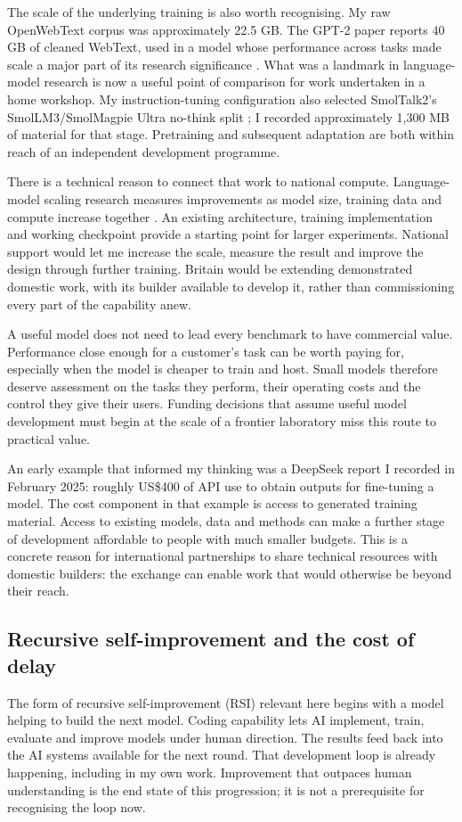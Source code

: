 The scale of the underlying training is also worth recognising. My raw
OpenWebText corpus was approximately 22.5 GB. The GPT-2 paper reports
40 GB of cleaned WebText, used in a model whose performance across tasks
made scale a major part of its research significance \cite{radford2019}.
What was a landmark in language-model research is now a useful point of
comparison for work undertaken in a home workshop. My instruction-tuning
configuration also selected SmolTalk2's SmolLM3/SmolMagpie Ultra no-think
split \cite{smoltalk2}; I recorded approximately 1,300 MB of material for
that stage. Pretraining and subsequent adaptation are both within reach
of an independent development programme.

There is a technical reason to connect that work to national compute.
Language-model scaling research measures improvements as model size,
training data and compute increase together \cite{kaplan2020}. An existing
architecture, training implementation and working checkpoint provide a
starting point for larger experiments. National support would let me
increase the scale, measure the result and improve the design through
further training. Britain would be extending demonstrated domestic work,
with its builder available to develop it, rather than commissioning every
part of the capability anew.

A useful model does not need to lead every benchmark to have commercial
value. Performance close enough for a customer's task can be worth paying
for, especially when the model is cheaper to train and host. Small models
therefore deserve assessment on the tasks they perform, their operating
costs and the control they give their users. Funding decisions that assume
useful model development must begin at the scale of a frontier laboratory
miss this route to practical value.

An early example that informed my thinking was a DeepSeek report I
recorded in February 2025: roughly US\$400 of API use to obtain outputs for
fine-tuning a model. The cost
component in that example is access to generated training material. Access
to existing models, data and methods can make a further stage of development
affordable to people with much smaller budgets. This is a concrete reason
for international partnerships to share technical resources with domestic
builders: the exchange can enable work that would otherwise be beyond
their reach.

\subsection{Recursive self-improvement and the cost of delay}
\label{sec:rsi}
The form of recursive self-improvement (RSI) relevant here begins with a
model helping to build the next model. Coding capability lets AI implement,
train, evaluate and improve models under human direction. The results feed
back into the AI systems available for the next round. That development loop is
already happening, including in my own work. Improvement that outpaces
human understanding is the end state of this progression; it is not a
prerequisite for recognising the loop now.

